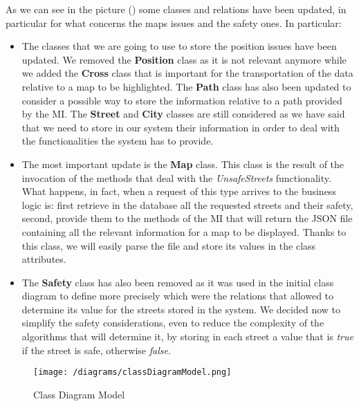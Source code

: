 		As we can see in the picture () some classes and relations have been updated, in particular for what concerns the maps issues and the safety ones. In particular:
		
		\begin{itemize}
			\item The classes that we are going to use to store the position issues have been updated. We removed the \textbf{Position} class as it is not relevant anymore while we added the \textbf{Cross} class that is important for the transportation of the data relative to a map to be highlighted. The \textbf{Path} class has also been updated to consider a possible way to store the information relative to a path provided by the MI. The \textbf{Street} and \textbf{City} classes are still considered as we have said that we need to store in our system their information in order to deal with the functionalities the system has to provide.
			
			\item The most important update is the \textbf{Map} class. This class is the result of the invocation of the methods that deal with the \emph{UnsafeStreets} functionality. What happens, in fact, when a request of this type arrives to the business logic is: first retrieve in the database all the requested streets and their safety, second, provide them to the methods of the MI that will return the JSON file containing all the relevant information for a map to be displayed. Thanks to this class, we will easily parse the file and store its values in the class attributes.
			
			\item The \textbf{Safety} class has also been removed as it was used in the initial class diagram to define more precisely which were the relations that allowed to determine its value for the streets stored in the system. We decided now to simplify the safety considerations, even to reduce the complexity of the algorithms that will determine it, by storing in each street a value that is \emph{true} if the street is safe, otherwise \emph{false}.		
		\end{itemize}
		
		\newpage
		
		\begin{figure}[ht!bp]
			\centering
			\texttt{[image: /diagrams/classDiagramModel.png]}
			\caption{\label{fig:classDiagramModel} Class Diagram Model}
		\end{figure}
	
